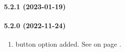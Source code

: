 \paragraph{5.2.1 (2023-01-19)}  %

\paragraph{5.2.0 (2022-11-24)}  %
\begin{enumerate}
\item \FOLDER{} button option \HIDDEN{} added.
      See  on page \pageref{dia:uifolderbutton}.
\end{enumerate}
